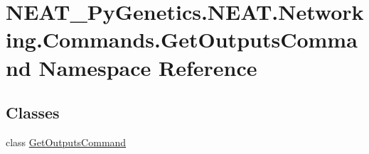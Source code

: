 \hypertarget{namespaceNEAT__PyGenetics_1_1NEAT_1_1Networking_1_1Commands_1_1GetOutputsCommand}{}\section{N\+E\+A\+T\+\_\+\+Py\+Genetics.\+N\+E\+A\+T.\+Networking.\+Commands.\+Get\+Outputs\+Command Namespace Reference}
\label{namespaceNEAT__PyGenetics_1_1NEAT_1_1Networking_1_1Commands_1_1GetOutputsCommand}
\subsection*{Classes}
\begin{DoxyCompactItemize}
\item 
class \hyperlink{classNEAT__PyGenetics_1_1NEAT_1_1Networking_1_1Commands_1_1GetOutputsCommand_1_1GetOutputsCommand}{Get\+Outputs\+Command}
\end{DoxyCompactItemize}
